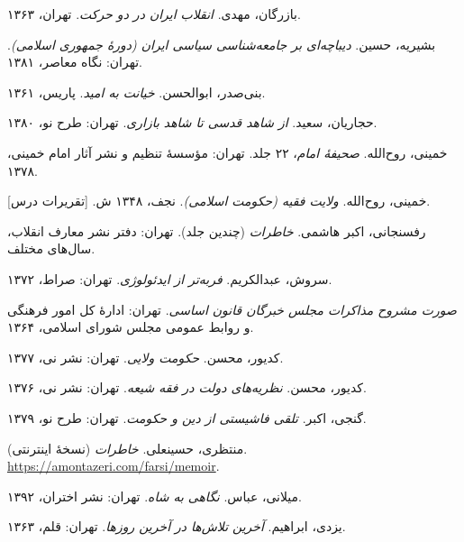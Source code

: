 \begin{enumerate}[label={[\arabic*]}, leftmargin=2cm]

\item
بازرگان، مهدی.
\textit{انقلاب ایران در دو حرکت}.
تهران، ۱۳۶۳.

\item
بشیریه، حسین.
\textit{دیباچه‌ای بر جامعه‌شناسی سیاسی ایران (دورهٔ جمهوری اسلامی)}.
تهران: نگاه معاصر، ۱۳۸۱.

\item
بنی‌صدر، ابوالحسن.
\textit{خیانت به امید}.
پاریس، ۱۳۶۱.

\item
حجاریان، سعید.
\textit{از شاهد قدسی تا شاهد بازاری}.
تهران: طرح نو، ۱۳۸۰.

\item
خمینی، روح‌الله.
\textit{صحیفهٔ امام}، ۲۲ جلد.
تهران: مؤسسهٔ تنظیم و نشر آثار امام خمینی، ۱۳۷۸.

\item
خمینی، روح‌الله.
\textit{ولایت فقیه (حکومت اسلامی)}.
نجف، ۱۳۴۸ ش. [تقریرات درس].

\item
رفسنجانی، اکبر هاشمی.
\textit{خاطرات} (چندین جلد).
تهران: دفتر نشر معارف انقلاب، سال‌های مختلف.

\item
سروش، عبدالکریم.
\textit{فربه‌تر از ایدئولوژی}.
تهران: صراط، ۱۳۷۲.

\item
\textit{صورت مشروح مذاکرات مجلس خبرگان قانون اساسی}.
تهران: ادارهٔ کل امور فرهنگی و روابط عمومی مجلس شورای اسلامی، ۱۳۶۴.

\item
کدیور، محسن.
\textit{حکومت ولایی}.
تهران: نشر نی، ۱۳۷۷.

\item
کدیور، محسن.
\textit{نظریه‌های دولت در فقه شیعه}.
تهران: نشر نی، ۱۳۷۶.

\item
گنجی، اکبر.
\textit{تلقی فاشیستی از دین و حکومت}.
تهران: طرح نو، ۱۳۷۹.

\item
منتظری، حسینعلی.
\textit{خاطرات} (نسخهٔ اینترنتی).
\url{https://amontazeri.com/farsi/memoir}.

\item
میلانی، عباس.
\textit{نگاهی به شاه}.
تهران: نشر اختران، ۱۳۹۲.

\item
یزدی، ابراهیم.
\textit{آخرین تلاش‌ها در آخرین روزها}.
تهران: قلم، ۱۳۶۳.

\end{enumerate}

